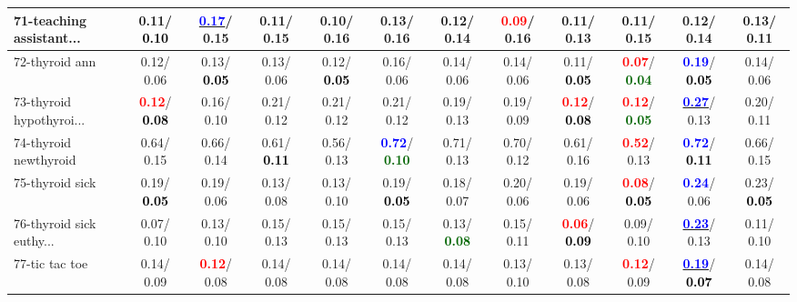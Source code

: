 \begin{table}[h]
\begin{center}
{\begin{tabular}{lc|c|c|c|c|c|c|c|c|c|c}
71-teaching assistant... &   0.11/\textcolor{black}{\textbf{  0.10}} & \underline{\textcolor{blue}{\textbf{  0.17}}}/  0.15 &   0.11/  0.15 &   0.10/  0.16 &   0.13/  0.16 &   0.12/  0.14 & \textcolor{red}{\textbf{  0.09}}/  0.16 &   0.11/  0.13 &   0.11/  0.15 &   0.12/  0.14 &   0.13/  0.11 \\ \hline
72-thyroid ann &   0.12/  0.06 &   0.13/\textcolor{black}{\textbf{  0.05}} &   0.13/  0.06 &   0.12/\textcolor{black}{\textbf{  0.05}} &   0.16/  0.06 &   0.14/  0.06 &   0.14/  0.06 &   0.11/\textcolor{black}{\textbf{  0.05}} & \textcolor{red}{\textbf{  0.07}}/\textcolor{darkgreen}{\textbf{  0.04}} & \textcolor{blue}{\textbf{  0.19}}/\textcolor{black}{\textbf{  0.05}} &   0.14/  0.06 \\
73-thyroid hypothyroi... & \textcolor{red}{\textbf{  0.12}}/\textcolor{black}{\textbf{  0.08}} &   0.16/  0.10 &   0.21/  0.12 &   0.21/  0.12 &   0.21/  0.12 &   0.19/  0.13 &   0.19/  0.09 & \textcolor{red}{\textbf{  0.12}}/\textcolor{black}{\textbf{  0.08}} & \textcolor{red}{\textbf{  0.12}}/\textcolor{darkgreen}{\textbf{  0.05}} & \underline{\textcolor{blue}{\textbf{  0.27}}}/  0.13 &   0.20/  0.11 \\
74-thyroid newthyroid &   0.64/  0.15 &   0.66/  0.14 &   0.61/\textcolor{black}{\textbf{  0.11}} &   0.56/  0.13 & \textcolor{blue}{\textbf{  0.72}}/\textcolor{darkgreen}{\textbf{  0.10}} &   0.71/  0.13 &   0.70/  0.12 &   0.61/  0.16 & \textcolor{red}{\textbf{  0.52}}/  0.13 & \textcolor{blue}{\textbf{  0.72}}/\textcolor{black}{\textbf{  0.11}} &   0.66/  0.15 \\
75-thyroid sick &   0.19/\textcolor{black}{\textbf{  0.05}} &   0.19/  0.06 &   0.13/  0.08 &   0.13/  0.10 &   0.19/\textcolor{black}{\textbf{  0.05}} &   0.18/  0.07 &   0.20/  0.06 &   0.19/  0.06 & \textcolor{red}{\textbf{  0.08}}/\textcolor{black}{\textbf{  0.05}} & \textcolor{blue}{\textbf{  0.24}}/  0.06 &   0.23/\textcolor{black}{\textbf{  0.05}} \\
76-thyroid sick euthy... &   0.07/  0.10 &   0.13/  0.10 &   0.15/  0.13 &   0.15/  0.13 &   0.15/  0.13 &   0.13/\textcolor{darkgreen}{\textbf{  0.08}} &   0.15/  0.11 & \textcolor{red}{\textbf{  0.06}}/\textcolor{black}{\textbf{  0.09}} &   0.09/  0.10 & \underline{\textcolor{blue}{\textbf{  0.23}}}/  0.13 &   0.11/  0.10 \\
77-tic tac toe &   0.14/  0.09 & \textcolor{red}{\textbf{  0.12}}/  0.08 &   0.14/  0.08 &   0.14/  0.08 &   0.14/  0.08 &   0.14/  0.08 &   0.13/  0.10 &   0.13/  0.08 & \textcolor{red}{\textbf{  0.12}}/  0.09 & \underline{\textcolor{blue}{\textbf{  0.19}}}/\textcolor{black}{\textbf{  0.07}} &   0.14/  0.08 \\

\end{tabular}}
\end{center}
\end{table}
